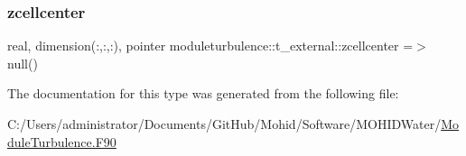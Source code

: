 \subsubsection{\texorpdfstring{zcellcenter}{zcellcenter}}
{\footnotesize\ttfamily real, dimension(\+:,\+:,\+:), pointer moduleturbulence\+::t\+\_\+external\+::zcellcenter =$>$ null()\hspace{0.3cm}{\ttfamily [private]}}



The documentation for this type was generated from the following file\+:\begin{DoxyCompactItemize}
\item 
C\+:/\+Users/administrator/\+Documents/\+Git\+Hub/\+Mohid/\+Software/\+M\+O\+H\+I\+D\+Water/\mbox{\hyperlink{_module_turbulence_8_f90}{Module\+Turbulence.\+F90}}\end{DoxyCompactItemize}
